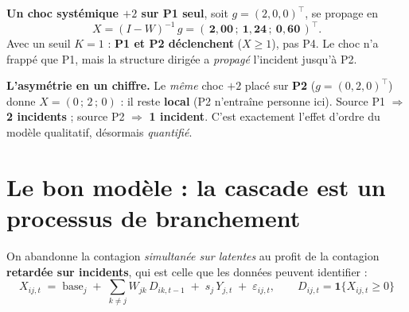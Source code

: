 \documentclass[11pt,a4paper]{article}
\newcommand{\Y}{Y}
\newcommand{\eps}{\varepsilon}
\begin{document}
\medskip\noindent\textbf{Un choc systémique $+2$ sur P1 seul}, soit $g=(2,0,0)^\top$, se
propage en
\begin{equation}
X = (I-W)^{-1}\,g = (\,\mathbf{2{,}00}\,;\ \mathbf{1{,}24}\,;\ \mathbf{0{,}60}\,)^\top .
\end{equation}
Avec un seuil $K=1$ : \textbf{P1 et P2 déclenchent} ($X\ge 1$), pas P4. Le choc n'a frappé que
P1, mais la structure dirigée a \emph{propagé} l'incident jusqu'à P2.

\begin{cle}
\textbf{L'asymétrie en un chiffre.} Le \emph{même} choc $+2$ placé sur \textbf{P2}
($g=(0,2,0)^\top$) donne $X=(0\,;\,2\,;\,0)$ : il reste \textbf{local} (P2 n'entraîne personne
ici). Source P1 $\Rightarrow$ \textbf{2 incidents} ; source P2 $\Rightarrow$ \textbf{1 incident}.
C'est exactement l'effet d'ordre du modèle qualitatif, désormais \emph{quantifié}.
\end{cle}

\section{Le bon modèle : la cascade est un processus de branchement}
\label{sec:branch}

On abandonne la contagion \emph{simultanée sur latentes} au profit de la contagion
\textbf{retardée sur incidents}, qui est celle que les données peuvent identifier :
\begin{equation}
\label{eq:dyn}
\boxed{\;X_{ij,t} \;=\; \text{base}_j \;+\; \sum_{k\neq j} W_{jk}\,D_{ik,t-1}
  \;+\; s_j\,\Y_{j,t} \;+\; \eps_{ij,t}, \qquad D_{ij,t} = \mathbf 1\{X_{ij,t} \ge 0\}\;}
\end{equation}
\end{document}
